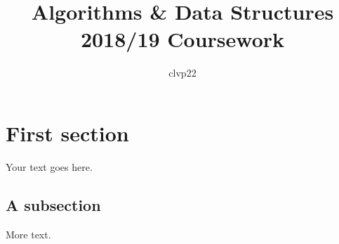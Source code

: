 \documentclass[]{article}
\title{Algorithms \& Data Structures 2018/19 Coursework}
\author{clvp22}
\begin{document}
\maketitle

\section{First section}

Your text goes here.

\subsection{A subsection}

More text.
\end{document}
